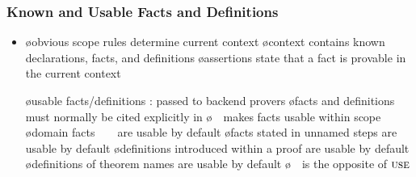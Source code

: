 \begin{frame}
  \frametitle{Known and Usable Facts and Definitions}

  \begin{itemize}
  \item {}

    \begin{itemize}
    \o obvious scope rules determine current context
    \o context contains known declarations, facts, and definitions
    \o assertions state that a fact is provable in the current context
    \end{itemize}

  \oo {}

    \begin{itemize}
    \o \alert{usable facts/definitions} : passed to backend provers
    \o facts and definitions must normally be cited explicitly in \BY
    \o {}\ \ makes
       facts usable within scope
    \o domain facts\ \ \ \ are usable by default
    \o facts stated in unnamed steps are usable by default
    \o definitions introduced within a proof are usable by default
    \o definitions of theorem names are usable by default
    \o {}\ \ is the opposite of $\textsc{use}$
    \end{itemize}
  \end{itemize}
\end{frame}

